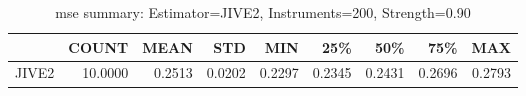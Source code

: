 \begin{table}[ht]
\centering
\caption{mse summary: Estimator=JIVE2, Instruments=200, Strength=0.90}
\begin{tabular}{lrrrrrrrr}
\toprule
 & COUNT & MEAN & STD & MIN & 25\% & 50\% & 75\% & MAX \\
\midrule
JIVE2 & 10.0000 & 0.2513 & 0.0202 & 0.2297 & 0.2345 & 0.2431 & 0.2696 & 0.2793 \\
\bottomrule
\end{tabular}
\end{table}

